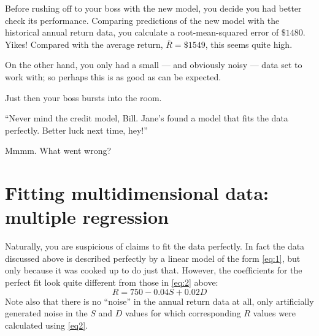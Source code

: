 \documentclass[11pt, reqno]{amsart} \usepackage{hyperlatex}
\begin{document}
Before rushing off to your boss with the new model, you decide you had
better check its performance. Comparing predictions of the new model
with the historical annual return data, you calculate a
root-mean-squared error of $\$1480 $. Yikes! Compared with the average
return, ${\bar R} = \$1549$, this seems quite high. 

On the other hand, you only had a small --- and obviously noisy ---
data set to work with; so perhaps this is as good as can be expected.

Just then your boss bursts into the room.

``Never mind the credit model, Bill. Jane's found a model that fits
the data perfectly. Better luck next time, hey!''

Mmmm. What went wrong?

\section*{Fitting multidimensional data: multiple regression}
Naturally, you are suspicious of claims to fit the data
perfectly. In fact the data discussed above is described perfectly by
a linear model of the form \eqref{eq:1}, but only because it was
cooked up to do just that.  However, the coefficients for the perfect
fit look quite different from those in \eqref{eq:2} above:
\begin{equation}
  R =  750 - 0.04S + 0.02D
\label{eq2}
\end{equation}
Note also that there is no ``noise'' in the annual return data at all,
only artificially generated noise in the $S$ and $D$ values for which
corresponding $R$ values were calculated using \eqref{eq2}.
\end{document}
